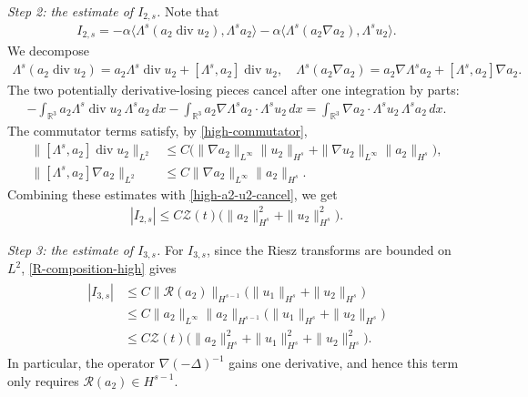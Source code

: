 \documentclass[10pt,reqno]{amsart}
\numberwithin{equation}{section}
\begin{document}
\medskip
\noindent\emph{Step 2: the estimate of $I_{2,s}$.} Note that
\begin{align*}
I_{2,s}=- \alpha\langle\Lambda^s(a_2\operatorname{div}u_2),\Lambda^sa_2\rangle
-\alpha\langle\Lambda^s(a_2\nabla a_2),\Lambda^su_2\rangle.
\end{align*}
We decompose
\begin{align*}
\Lambda^s(a_2\operatorname{div}u_2) =a_2\Lambda^s\operatorname{div}u_2
+[\Lambda^s,a_2]\operatorname{div}u_2,\quad \Lambda^s(a_2\nabla a_2) =a_2\nabla\Lambda^sa_2+[\Lambda^s,a_2]\nabla a_2.
\end{align*}
The two potentially derivative-losing pieces cancel after one integration by parts:
\begin{align}\label{high-a2-u2-cancel}
 -\int_{\mathbb R^3}a_2\Lambda^s\operatorname{div}u_2\,\Lambda^sa_2\,dx
-\int_{\mathbb R^3}a_2\nabla\Lambda^sa_2\cdot\Lambda^su_2\,dx =\int_{\mathbb R^3}\nabla a_2\cdot\Lambda^su_2\,\Lambda^sa_2\,dx.
\end{align}
The commutator terms satisfy, by \eqref{high-commutator},
\begin{align*}
\|[\Lambda^s,a_2]\operatorname{div}u_2\|_{L^2}
&\le C\big(\|\nabla a_2\|_{L^\infty}\|u_2\|_{H^s}
+\|\nabla u_2\|_{L^\infty}\|a_2\|_{H^s}\big),\\
\|[\Lambda^s,a_2]\nabla a_2\|_{L^2}
&\le C\|\nabla a_2\|_{L^\infty}\|a_2\|_{H^s}.
\end{align*}
Combining these estimates with \eqref{high-a2-u2-cancel}, we get
\begin{align}\label{high-I2}
|I_{2,s}|\le C\mathcal Z(t)
\big(\|a_2\|_{H^s}^2+\|u_2\|_{H^s}^2\big).
\end{align}

\medskip
\noindent\emph{Step 3: the estimate of $I_{3,s}$.}
For $I_{3,s}$, since the Riesz transforms are bounded on $L^2$,
\eqref{R-composition-high} gives
\begin{align}\label{I3s}
\begin{aligned}
|I_{3,s}|
&\le C\|\mathcal R(a_2)\|_{H^{s-1}} \big(\|u_1\|_{H^s}+\|u_2\|_{H^s}\big)\\
&\le C\|a_2\|_{L^\infty}\|a_2\|_{H^{s-1}} \big(\|u_1\|_{H^s}+\|u_2\|_{H^s}\big)\\
&\le C\mathcal Z(t) \big(\|a_2\|_{H^s}^2+\|u_1\|_{H^s}^2+\|u_2\|_{H^s}^2\big).
\end{aligned}
\end{align}
In particular, the operator $\nabla(-\Delta)^{-1}$ gains one derivative, and hence
this term only requires $\mathcal R(a_2)\in H^{s-1}$.
\end{document}

